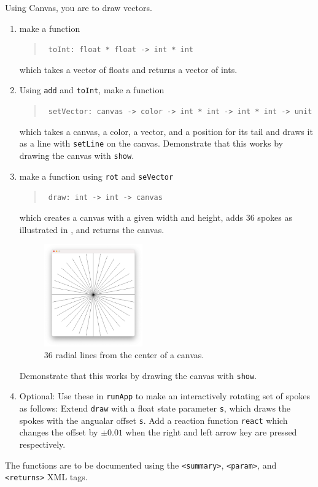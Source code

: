 Using Canvas, you are to draw vectors.
\begin{enumerate}
\item make a function
  \begin{quote}
    \mbox{\lstinline! toInt: float * float -> int * int!}
  \end{quote}
  which takes a vector of floats and returns a vector of ints.
\item Using \lstinline{add} and \lstinline{toInt}, make a function
  \begin{quote}
    \mbox{\lstinline! setVector: canvas -> color -> int * int -> int * int -> unit!}
  \end{quote}
  which takes a canvas, a color, a vector, and a position for its tail and draws it as a line with \lstinline{setLine} on the canvas. Demonstrate that this works by drawing the canvas with \lstinline{show}.
\item make a function using \lstinline{rot} and \lstinline{seVector}
  \begin{quote}
    \mbox{\lstinline! draw: int -> int -> canvas!}
  \end{quote}
  which creates a canvas with a given width and height, adds 36 spokes as illustrated in , and returns the canvas.
  \begin{figure}
    \centering
    \includegraphics[width=0.4\textwidth]{spokes}
    \caption{36 radial lines from the center of a canvas.}
    \label{fig:spokes}
  \end{figure}
  Demonstrate that this works by drawing the canvas with \lstinline{show}.
\item Optional: Use these in \lstinline{runApp} to make an interactively rotating set of spokes as follows: Extend \lstinline{draw} with a float state parameter \lstinline{s}, which draws the spokes with the angualar offset \lstinline{s}. Add a reaction function \lstinline{react} which changes the offset by $\pm0.01$ when the right and left arrow key are pressed respectively.
\end{enumerate}
The functions are to be documented using the \verb|<summary>|, \verb|<param>|, and \verb|<returns>| XML tags.

